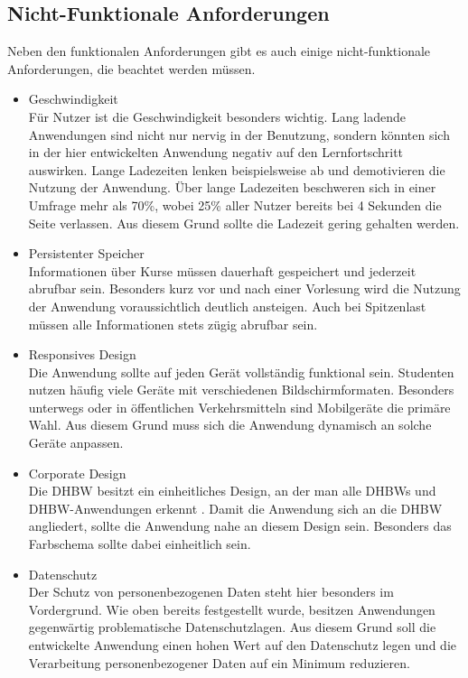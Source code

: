\subsection{Nicht-Funktionale Anforderungen}
Neben den funktionalen Anforderungen gibt es auch einige nicht-funktionale Anforderungen, die beachtet werden müssen.
\begin{itemize}
    \item Geschwindigkeit\\
        Für Nutzer ist die Geschwindigkeit besonders wichtig.
        Lang ladende Anwendungen sind nicht nur nervig in der Benutzung, sondern könnten sich in der hier entwickelten Anwendung negativ auf den Lernfortschritt auswirken. Lange Ladezeiten lenken beispielsweise ab und demotivieren die Nutzung der Anwendung.
        Über lange Ladezeiten beschweren sich in einer Umfrage mehr als 70\%, wobei 25\% aller Nutzer bereits bei 4 Sekunden die Seite verlassen.\autocite{loadingTimes}
        Aus diesem Grund sollte die Ladezeit gering gehalten werden.
    \item Persistenter Speicher             \\
        Informationen über Kurse müssen dauerhaft gespeichert und jederzeit abrufbar sein.
        Besonders kurz vor und nach einer Vorlesung wird die Nutzung der Anwendung voraussichtlich deutlich ansteigen.
        Auch bei Spitzenlast müssen alle Informationen stets zügig abrufbar sein.
    \item Responsives Design\\
        Die Anwendung sollte auf jeden Gerät vollständig funktional sein.
        Studenten nutzen häufig viele Geräte mit verschiedenen Bildschirmformaten.
        Besonders unterwegs oder in öffentlichen Verkehrsmitteln sind Mobilgeräte die primäre Wahl.
        Aus diesem Grund muss sich die Anwendung dynamisch an solche Geräte anpassen.
    \item Corporate Design\\
        Die DHBW besitzt ein einheitliches Design, an der man alle DHBWs und DHBW-Anwendungen erkennt \autocite{CD-DHBW}.
        Damit die Anwendung sich an die DHBW angliedert, sollte die Anwendung nahe an diesem Design sein.
        Besonders das Farbschema sollte dabei einheitlich sein. %
    \item Datenschutz\\
        Der Schutz von personenbezogenen Daten steht hier besonders im Vordergrund.
        Wie oben bereits festgestellt wurde, besitzen Anwendungen gegenwärtig problematische Datenschutzlagen.
        Aus diesem Grund soll die entwickelte Anwendung einen hohen Wert auf den Datenschutz legen und die Verarbeitung personenbezogener Daten auf ein Minimum reduzieren.
\end{itemize}



